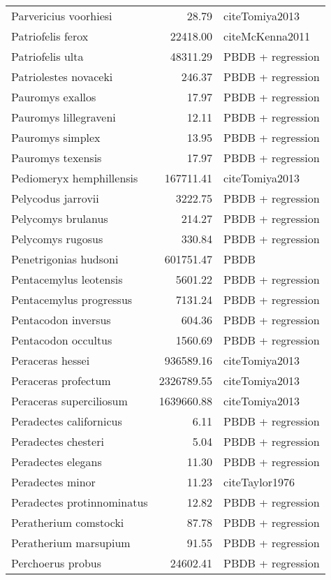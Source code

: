 \begin{table}[ht]
\begin{tabular}{lrl}
  Parvericius voorhiesi & 28.79 & cite{Tomiya2013} \\ 
  Patriofelis ferox & 22418.00 & cite{McKenna2011} \\ 
  Patriofelis ulta & 48311.29 & PBDB + regression \\ 
  Patriolestes novaceki & 246.37 & PBDB + regression \\ 
  Pauromys exallos & 17.97 & PBDB + regression \\ 
  Pauromys lillegraveni & 12.11 & PBDB + regression \\ 
  Pauromys simplex & 13.95 & PBDB + regression \\ 
  Pauromys texensis & 17.97 & PBDB + regression \\ 
  Pediomeryx hemphillensis & 167711.41 & cite{Tomiya2013} \\ 
  Pelycodus jarrovii & 3222.75 & PBDB + regression \\ 
  Pelycomys brulanus & 214.27 & PBDB + regression \\ 
  Pelycomys rugosus & 330.84 & PBDB + regression \\ 
  Penetrigonias hudsoni & 601751.47 & PBDB \\ 
  Pentacemylus leotensis & 5601.22 & PBDB + regression \\ 
  Pentacemylus progressus & 7131.24 & PBDB + regression \\ 
  Pentacodon inversus & 604.36 & PBDB + regression \\ 
  Pentacodon occultus & 1560.69 & PBDB + regression \\ 
  Peraceras hessei & 936589.16 & cite{Tomiya2013} \\ 
  Peraceras profectum & 2326789.55 & cite{Tomiya2013} \\ 
  Peraceras superciliosum & 1639660.88 & cite{Tomiya2013} \\ 
  Peradectes californicus & 6.11 & PBDB + regression \\ 
  Peradectes chesteri & 5.04 & PBDB + regression \\ 
  Peradectes elegans & 11.30 & PBDB + regression \\ 
  Peradectes minor & 11.23 & cite{Taylor1976} \\ 
  Peradectes protinnominatus & 12.82 & PBDB + regression \\ 
  Peratherium comstocki & 87.78 & PBDB + regression \\ 
  Peratherium marsupium & 91.55 & PBDB + regression \\ 
  Perchoerus probus & 24602.41 & PBDB + regression \\ 

\end{tabular}
\end{table}
